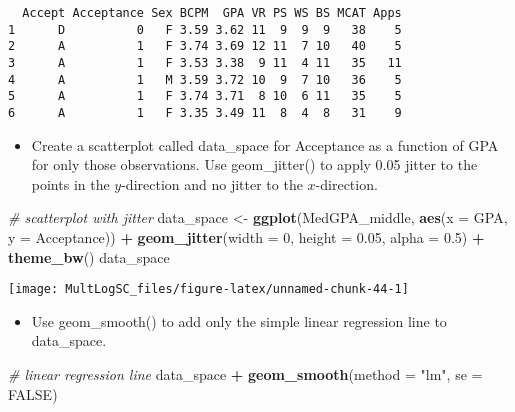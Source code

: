 \documentclass[]{book}
\newenvironment{Shaded}{\begin{snugshade}}{\end{snugshade}}
\newcommand{\KeywordTok}[1]{\textcolor[rgb]{0.13,0.29,0.53}{\textbf{#1}}}
\newcommand{\DataTypeTok}[1]{\textcolor[rgb]{0.13,0.29,0.53}{#1}}
\newcommand{\DecValTok}[1]{\textcolor[rgb]{0.00,0.00,0.81}{#1}}
\newcommand{\FloatTok}[1]{\textcolor[rgb]{0.00,0.00,0.81}{#1}}
\newcommand{\StringTok}[1]{\textcolor[rgb]{0.31,0.60,0.02}{#1}}
\newcommand{\CommentTok}[1]{\textcolor[rgb]{0.56,0.35,0.01}{\textit{#1}}}
\newcommand{\OtherTok}[1]{\textcolor[rgb]{0.56,0.35,0.01}{#1}}
\newcommand{\OperatorTok}[1]{\textcolor[rgb]{0.81,0.36,0.00}{\textbf{#1}}}
\newcommand{\NormalTok}[1]{#1}
\providecommand{\tightlist}{%
  \setlength{\itemsep}{0pt}\setlength{\parskip}{0pt}}
\begin{document}
\begin{verbatim}
  Accept Acceptance Sex BCPM  GPA VR PS WS BS MCAT Apps
1      D          0   F 3.59 3.62 11  9  9  9   38    5
2      A          1   F 3.74 3.69 12 11  7 10   40    5
3      A          1   F 3.53 3.38  9 11  4 11   35   11
4      A          1   M 3.59 3.72 10  9  7 10   36    5
5      A          1   F 3.74 3.71  8 10  6 11   35    5
6      A          1   F 3.35 3.49 11  8  4  8   31    9
\end{verbatim}

\begin{itemize}
\tightlist
\item
  Create a scatterplot called data\_space for Acceptance as a function
  of GPA for only those observations. Use geom\_jitter() to apply 0.05
  jitter to the points in the \(y\)-direction and no jitter to the
  \(x\)-direction.
\end{itemize}

\begin{Shaded}
\begin{Highlighting}[]
\CommentTok{# scatterplot with jitter}
\NormalTok{data_space <-}\StringTok{ }\KeywordTok{ggplot}\NormalTok{(MedGPA_middle, }\KeywordTok{aes}\NormalTok{(}\DataTypeTok{x =}\NormalTok{ GPA, }\DataTypeTok{y =}\NormalTok{ Acceptance)) }\OperatorTok{+}\StringTok{ }
\StringTok{  }\KeywordTok{geom_jitter}\NormalTok{(}\DataTypeTok{width =} \DecValTok{0}\NormalTok{, }\DataTypeTok{height =} \FloatTok{0.05}\NormalTok{, }\DataTypeTok{alpha =} \FloatTok{0.5}\NormalTok{) }\OperatorTok{+}\StringTok{ }
\StringTok{  }\KeywordTok{theme_bw}\NormalTok{()}
\NormalTok{data_space}
\end{Highlighting}
\end{Shaded}

\begin{center}\texttt{[image: MultLogSC\_files/figure-latex/unnamed-chunk-44-1]} \end{center}

\begin{itemize}
\tightlist
\item
  Use geom\_smooth() to add only the simple linear regression line to
  data\_space.
\end{itemize}

\begin{Shaded}
\begin{Highlighting}[]
\CommentTok{# linear regression line}
\NormalTok{data_space }\OperatorTok{+}\StringTok{ }
\StringTok{  }\KeywordTok{geom_smooth}\NormalTok{(}\DataTypeTok{method =} \StringTok{"lm"}\NormalTok{, }\DataTypeTok{se =} \OtherTok{FALSE}\NormalTok{)}
\end{Highlighting}
\end{Shaded}
\end{document}
